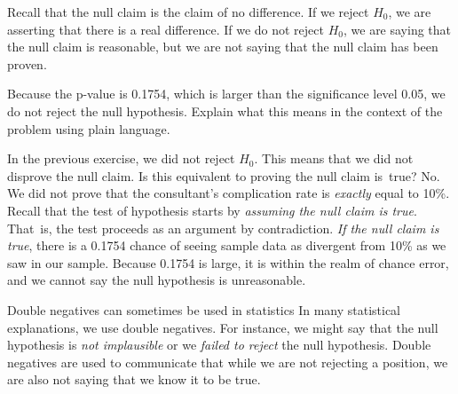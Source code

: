 Recall that the null claim is the claim of no difference. If we reject $H_0$, we are asserting that there is a real difference. If we do not reject $H_0$, we are saying that the null claim is reasonable, but we are not saying that the null claim has been proven.

\begin{exercisewrap}
\begin{nexercise} \label{plainLanguageExplanationOfHTConclusionForLiverDonorSurgicalConsultant}
Because the p-value is 0.1754, which is larger than the significance level 0.05, we do not reject the null hypothesis. Explain what this means in the context of the problem using plain language.\footnotemark
\end{nexercise}
\end{exercisewrap}

\begin{examplewrap}
\begin{nexample}{In the previous exercise, we did not reject $H_0$. This means that we did not disprove the null claim. Is this equivalent to proving the null claim is~true?}
No. We did not prove that the consultant's complication rate is \emph{exactly} equal to 10\%. Recall that the test of hypothesis starts by \emph{assuming the null claim is true}. That~is, the test proceeds as an argument by contradiction. \emph{If the null claim is true}, there is a 0.1754 chance of seeing sample data as divergent from 10\% as we saw in our sample. Because 0.1754 is large, it is within the realm of chance error, and we cannot say the null hypothesis is unreasonable.\footnotemark
\end{nexample}
\end{examplewrap}


\begin{onebox}{Double negatives can sometimes be used in statistics}
In many statistical explanations, we use double negatives. For instance, we might say that the null hypothesis is \emph{not implausible} or we \emph{failed to reject} the null hypothesis. Double negatives are used to communicate that while we are not rejecting a position, we are also not saying that we know it to be true.\end{onebox}

